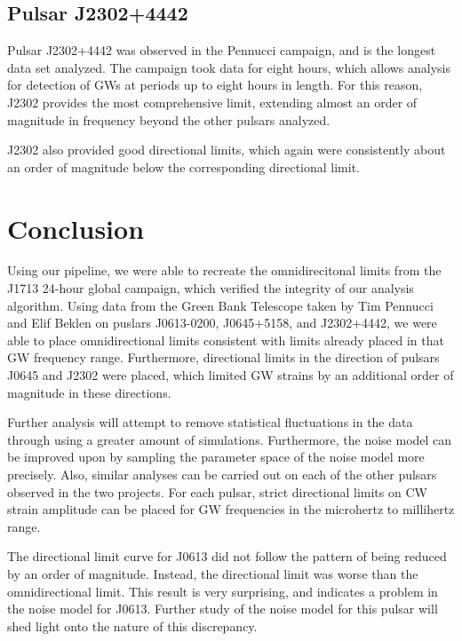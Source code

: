 \documentclass[12pt]{article}
\begin{document}
\subsection{Pulsar J2302+4442}

Pulsar J2302+4442 was observed in the Pennucci campaign, and is the longest data
set analyzed. The campaign took data for eight hours, which allows analysis for
detection of GWs at periods up to eight hours in length. For this reason, J2302
provides the most comprehensive limit, extending almost an order of magnitude in
frequency beyond the other pulsars analyzed.

J2302 also provided good directional limits, which again were consistently about
an order of magnitude below the corresponding directional limit.

\section{Conclusion}
    Using our pipeline, we were able to recreate the omnidirecitonal limits from the J1713 24-hour global campaign, which verified the
integrity of our analysis algorithm. Using data from the Green Bank Telescope
taken by Tim Pennucci and Elif Beklen on puslars J0613-0200, J0645+5158, and
J2302+4442, we
were able to place omnidirectional limits consistent with limits already placed
in that GW frequency range. 
    Furthermore, directional limits in the direction of pulsars J0645 and J2302
    were placed, which limited GW strains by an additional order of magnitude in
    these directions.

    Further analysis will attempt to remove statistical fluctuations in the data
through using a greater amount of simulations. Furthermore, the noise model can
be improved upon by sampling the parameter space of the noise model more
precisely. Also, similar analyses can be carried out on each of the other
pulsars observed in the two projects. For
each pulsar, strict directional limits on CW strain amplitude can be placed for
GW frequencies in the microhertz to millihertz range.

The directional limit curve for J0613 did not follow the pattern of being
reduced by an order of magnitude. Instead, the directional limit was worse than
the omnidirectional limit. This result is very surprising, and indicates a
problem in the noise model for J0613. Further study of the noise model for this
pulsar will shed light onto the nature of this discrepancy.
\end{document}
